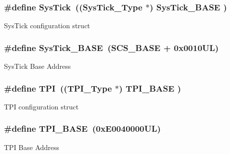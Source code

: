 \subsubsection[{\texorpdfstring{Sys\+Tick}{SysTick}}]{\setlength{\rightskip}{0pt plus 5cm}\#define Sys\+Tick~(({\bf Sys\+Tick\+\_\+\+Type}   $\ast$)     {\bf Sys\+Tick\+\_\+\+B\+A\+SE}  )}\hypertarget{group___c_m_s_i_s__core__base_gacd96c53beeaff8f603fcda425eb295de}{}\label{group___c_m_s_i_s__core__base_gacd96c53beeaff8f603fcda425eb295de}
Sys\+Tick configuration struct 
\subsubsection[{\texorpdfstring{Sys\+Tick\+\_\+\+B\+A\+SE}{SysTick_BASE}}]{\setlength{\rightskip}{0pt plus 5cm}\#define Sys\+Tick\+\_\+\+B\+A\+SE~({\bf S\+C\+S\+\_\+\+B\+A\+SE} +  0x0010\+U\+L)}\hypertarget{group___c_m_s_i_s__core__base_ga58effaac0b93006b756d33209e814646}{}\label{group___c_m_s_i_s__core__base_ga58effaac0b93006b756d33209e814646}
Sys\+Tick Base Address 
\subsubsection[{\texorpdfstring{T\+PI}{TPI}}]{\setlength{\rightskip}{0pt plus 5cm}\#define T\+PI~(({\bf T\+P\+I\+\_\+\+Type}       $\ast$)     {\bf T\+P\+I\+\_\+\+B\+A\+SE}      )}\hypertarget{group___c_m_s_i_s__core__base_ga8b4dd00016aed25a0ea54e9a9acd1239}{}\label{group___c_m_s_i_s__core__base_ga8b4dd00016aed25a0ea54e9a9acd1239}
T\+PI configuration struct 
\subsubsection[{\texorpdfstring{T\+P\+I\+\_\+\+B\+A\+SE}{TPI_BASE}}]{\setlength{\rightskip}{0pt plus 5cm}\#define T\+P\+I\+\_\+\+B\+A\+SE~(0x\+E0040000\+U\+L)}\hypertarget{group___c_m_s_i_s__core__base_ga2b1eeff850a7e418844ca847145a1a68}{}\label{group___c_m_s_i_s__core__base_ga2b1eeff850a7e418844ca847145a1a68}
T\+PI Base Address 